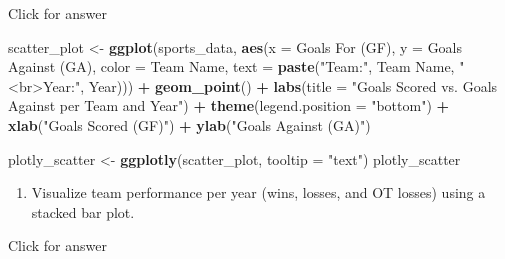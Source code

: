 \documentclass[
]{book}
\newenvironment{Shaded}{\begin{snugshade}}{\end{snugshade}}
\newcommand{\AttributeTok}[1]{\textcolor[rgb]{0.13,0.29,0.53}{#1}}
\newcommand{\FunctionTok}[1]{\textcolor[rgb]{0.13,0.29,0.53}{\textbf{#1}}}
\newcommand{\NormalTok}[1]{#1}
\newcommand{\OtherTok}[1]{\textcolor[rgb]{0.56,0.35,0.01}{#1}}
\newcommand{\SpecialCharTok}[1]{\textcolor[rgb]{0.81,0.36,0.00}{\textbf{#1}}}
\newcommand{\StringTok}[1]{\textcolor[rgb]{0.31,0.60,0.02}{#1}}
\providecommand{\tightlist}{%
  \setlength{\itemsep}{0pt}\setlength{\parskip}{0pt}}
\begin{document}
Click for answer

\begin{Shaded}
\begin{Highlighting}[]
\NormalTok{scatter\_plot }\OtherTok{\textless{}{-}} \FunctionTok{ggplot}\NormalTok{(sports\_data, }\FunctionTok{aes}\NormalTok{(}\AttributeTok{x =} \StringTok{\textasciigrave{}}\AttributeTok{Goals For (GF)}\StringTok{\textasciigrave{}}\NormalTok{, }\AttributeTok{y =} \StringTok{\textasciigrave{}}\AttributeTok{Goals Against (GA)}\StringTok{\textasciigrave{}}\NormalTok{, }\AttributeTok{color =} \StringTok{\textasciigrave{}}\AttributeTok{Team Name}\StringTok{\textasciigrave{}}\NormalTok{, }\AttributeTok{text =} \FunctionTok{paste}\NormalTok{(}\StringTok{"Team:"}\NormalTok{, }\StringTok{\textasciigrave{}}\AttributeTok{Team Name}\StringTok{\textasciigrave{}}\NormalTok{, }\StringTok{"\textless{}br\textgreater{}Year:"}\NormalTok{, Year))) }\SpecialCharTok{+}
  \FunctionTok{geom\_point}\NormalTok{() }\SpecialCharTok{+}
  \FunctionTok{labs}\NormalTok{(}\AttributeTok{title =} \StringTok{"Goals Scored vs. Goals Against per Team and Year"}\NormalTok{) }\SpecialCharTok{+}
  \FunctionTok{theme}\NormalTok{(}\AttributeTok{legend.position =} \StringTok{"bottom"}\NormalTok{) }\SpecialCharTok{+}
  \FunctionTok{xlab}\NormalTok{(}\StringTok{"Goals Scored (GF)"}\NormalTok{) }\SpecialCharTok{+}
  \FunctionTok{ylab}\NormalTok{(}\StringTok{"Goals Against (GA)"}\NormalTok{) }
\end{Highlighting}
\end{Shaded}

\begin{Shaded}
\begin{Highlighting}[]
\NormalTok{plotly\_scatter }\OtherTok{\textless{}{-}} \FunctionTok{ggplotly}\NormalTok{(scatter\_plot, }\AttributeTok{tooltip =} \StringTok{"text"}\NormalTok{)}
\NormalTok{plotly\_scatter}
\end{Highlighting}
\end{Shaded}

\begin{enumerate}
\def\labelenumi{\arabic{enumi}.}
\setcounter{enumi}{5}
\tightlist
\item
  Visualize team performance per year (wins, losses, and OT losses) using a stacked bar plot.
\end{enumerate}

Click for answer
\end{document}
